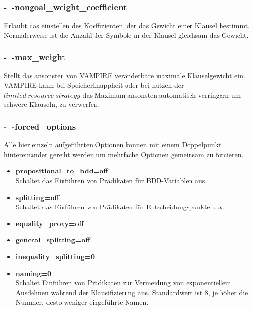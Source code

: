 \documentclass{article}
\begin{document}
\subsubsection{-~-nongoal\_weight\_coefficient}
\label{subsubsec: commandweightcoefficient}
Erlaubt das einstellen des Koeffizienten, der das Gewicht einer Klausel bestimmt. Normalerweise ist die Anzahl der Symbole in der Klausel gleichsam das Gewicht.
\subsubsection{-~-max\_weight}
\label{subsubsec: commandmaxweight}
Stellt das ansonsten von VAMPIRE veränderbare maximale Klauselgewicht ein. VAMPIRE kann bei Speicherknappheit oder bei nutzen der $ limited~resource~strategy $ das Maximum ansonsten automatisch verringern um schwere Klauseln, zu verwerfen.
\subsubsection{-~-forced\_options}
\label{subsubsec: commandforcedoptions}
Alle hier einzeln aufgeführten Optionen können mit einem Doppelpunkt hintereinander gereiht werden um mehrfache Optionen gemeinsam zu forcieren. 
\begin{itemize}
	\item \textbf{propositional\_to\_bdd=off}\\
	Schaltet das Einführen von Prädikaten für BDD-Variablen aus. \\
	\item \textbf{splitting=off}\\
	Schaltet das Einführen von Prädikaten für Entscheidungspunkte aus. \\
	\item \textbf{equality\_proxy=off}\\
	\item \textbf{general\_splitting=off}\\
	\item \textbf{inequality\_splitting=0}\\
	\item \textbf{naming=0}\\
	Schaltet Einführen von Prädikaten zur Vermeidung von exponentiellem Ausdehnen während der Klausifizierung aus.
	Standardwert ist 8, je höher die Nummer, desto weniger eingeführte Namen.\\
\end{itemize}
\end{document}

